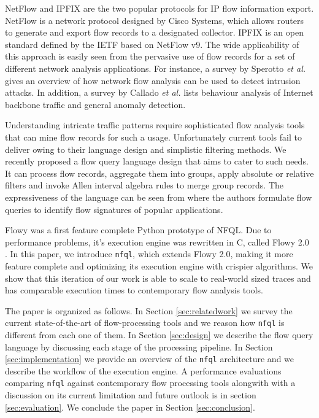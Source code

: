 NetFlow and \ac{IPFIX} are the two popular protocols for IP flow information
export. NetFlow \cite{rfc3954} is a network protocol designed by Cisco
Systems, which allows routers to generate and export flow records to a
designated collector. \ac{IPFIX} \cite{rfc5101} is an open standard defined by
the IETF based on NetFlow v$9$. The wide applicability of this approach is
easily seen from the pervasive use of flow records for a set of different
network analysis applications. For instance, a survey by Sperotto \textit{et
al.} \cite{sperotto:2010} gives an overview of how network flow analysis can
be used to detect intrusion attacks. In addition, a survey by Callado
\textit{et al.} \cite{callado:2009} lists behaviour analysis of Internet
backbone traffic and general anomaly detection.

Understanding intricate traffic patterns require sophisticated flow analysis
tools that can mine flow records for such a usage.  Unfortunately current
tools fail to deliver owing to their language design and simplistic filtering
methods.  We recently proposed a flow query language design
\cite{vmarinov:2009} that aims to cater to such needs.  It can process flow
records, aggregate them into groups, apply absolute or relative filters and
invoke Allen interval algebra rules \cite{fallen:1983} to merge group records.
The expressiveness of the language can be seen from \cite{vperelman:2011}
where the authors formulate flow queries to identify flow signatures of
popular applications.

Flowy \cite{kkanev:2010} was a first feature complete Python prototype of
\ac{NFQL}. Due to performance problems, it's execution engine was rewritten in
C, called Flowy 2.0 \cite{jschauer:thesis:2011}. In this paper, we introduce
\texttt{nfql}, which extends Flowy 2.0, making it more feature complete and
optimizing its execution engine with crispier algorithms.  We show that this
iteration of our work is able to scale to real-world sized traces and has
comparable execution times to contemporary flow analysis tools.

The paper is organized as follows. In Section \ref{sec:relatedwork} we survey
the current state-of-the-art of flow-processing tools and we reason how
\texttt{nfql} is different from each one of them. In Section \ref{sec:design}
we describe the flow query language by discussing each stage of the processing
pipeline. In Section \ref{sec:implementation} we provide an overview of the
\texttt{nfql} architecture and we describe the workflow of the execution
engine. A performance evaluations comparing \texttt{nfql} against contemporary
flow processing tools alongwith with a discussion on its current limitation
and future outlook is in section \ref{sec:evaluation}. We conclude the paper
in Section \ref{sec:conclusion}.

